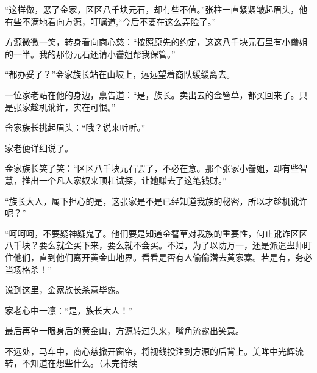 \begin{this_body}
“这样做，恶了金家，区区八千块元石，却有些不值。”张柱一直紧紧皱起眉头，他有些不满地看向方源，叮嘱道,“今后不要在这么弄险了。”

方源微微一笑，转身看向商心慈：“按照原先的约定，这这八千块元石里有小齤姐的一半。我的那份元石还请小齤姐帮我保管。”

“都办妥了？”金家族长站在山坡上，远远望着商队缓缓离去。

一位家老站在他的身边，禀告道：“是，族长。卖出去的金簪草，都买回来了。只是张家趁机讹诈，实在可恨。”

舍家族长挑起眉头：“哦？说来听听。”

家老便详细说了。

金家族长笑了笑：“区区八千块元石罢了，不必在意。那个张家小齤姐，却有些智慧，推出一个凡人家奴来顶杠试探，让她赚去了这笔钱财。”

“族长大人，属下担心的是，这张家是不是已经知道我族的秘密，所以才趁机讹诈呢？”

“呵呵呵，不要疑神疑鬼了。他们要是知道金簪草对我族的重要性，何止讹诈区区八千块？要么就全买下来，要么就不会买。不过，为了以防万一，还是派遣蛊师盯住他们，直到他们离开黄金山地界。看看是否有人偷偷潜去黄家寨。若是有，务必当场格杀！”

说到这里，金家族长杀意毕露。

家老心中一凛：“是，族长大人！”

最后再望一眼身后的黄金山，方源转过头来，嘴角流露出笑意。

不远处，马车中，商心慈掀开窗帘，将视线投注到方源的后背上。美眸中光辉流转，不知道在想些什么。（未完待续

\end{this_body}

